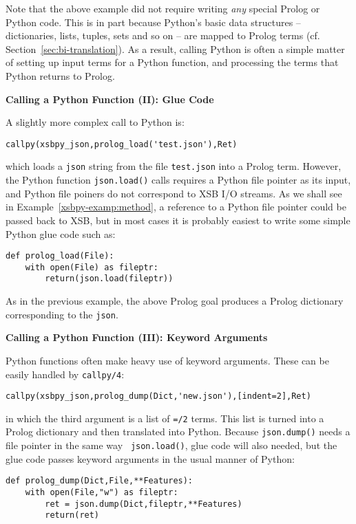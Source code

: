 Note that the above example did not require writing {\em any} special
Prolog or Python code.  This is in part because Python's basic data
structures -- dictionaries, lists, tuples, sets and so on -- are
mapped to Prolog terms (cf. Section~\ref{sec:bi-translation}).  As a
result, calling Python is often a simple matter of setting up input
terms for a Python function, and processing the terms that Python
returns to Prolog.

\begin{example} \rm {\bf Calling a Python Function (II): Glue Code} \label{xsbpy-examp:glue}

\noindent
  A slightly more complex call to Python is:
 \begin{verbatim}
callpy(xsbpy_json,prolog_load('test.json'),Ret)
\end{verbatim}

\noindent
which loads a {\tt json} string from the file {\tt test.json} into a
Prolog term.  However, the Python function {\tt json.load()} calls
requires a Python file pointer as its input, and Python file poiners
do not correspond to XSB I/O streams.  As we shall see in
Example~\ref{xsbpy-examp:method}, a reference to a Python file pointer
could be passed back to XSB, but in most cases it is probably easiest
to write some simple Python glue code such as:

\begin{verbatim}   
def prolog_load(File):
    with open(File) as fileptr:
        return(json.load(fileptr))
\end{verbatim}
\noindent
As in the previous example, the above Prolog goal produces a Prolog
dictionary corresponding to the {\tt json}.
\end{example}

\begin{example} \rm {\bf Calling a Python Function (III): Keyword Arguments}
  
\noindent
Python functions often make heavy use of keyword arguments.  These can
be easily handled by {\tt callpy/4}:
\begin{verbatim}
callpy(xsbpy_json,prolog_dump(Dict,'new.json'),[indent=2],Ret)
\end{verbatim}

\noindent
in which the third argument is a list of {\tt =/2} terms.  This list
is turned into a Prolog dictionary and then translated into Python.
Because {\tt json.dump()} needs a file pointer in the same way {\tt
  json.load()}, glue code will also needed, but the glue code passes
keyword arguments in the usual manner of Python:
\begin{verbatim}
def prolog_dump(Dict,File,**Features):
    with open(File,"w") as fileptr:
        ret = json.dump(Dict,fileptr,**Features)
        return(ret)
\end{verbatim}
\end{example}

